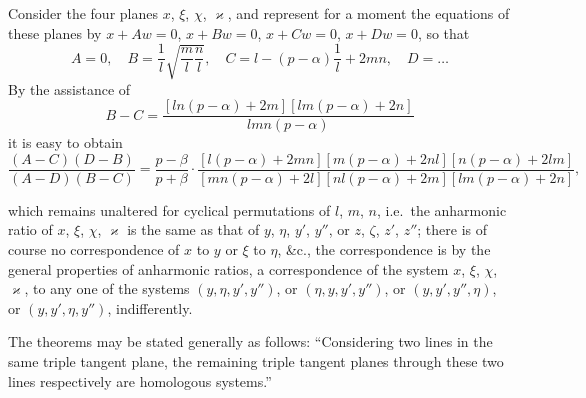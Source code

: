 \documentclass[11pt,a4paper]{book}
\begin{document}
Consider the four planes $x$, $\xi$, $\chi$, $\varkappa$, and represent for a moment the equations of these planes by $x + Aw = 0$, $x + Bw = 0$, $x + Cw = 0$, $x + Dw = 0$, so that
\[
A = 0, \quad B = \frac{1}{l}\sqrt{\frac{m}{l}\frac{n}{l}}, \quad C = l - (p - \alpha)\frac{1}{l} + 2mn, \quad D = \ldots
\]
By the assistance of
\[
B - C = \frac{[ln(p - \alpha) + 2m][lm(p - \alpha) + 2n]}{lmn(p - \alpha)}
\]
it is easy to obtain
\[
\frac{(A - C)(D - B)}{(A - D)(B - C)} = \frac{p - \beta}{p + \beta} \cdot \frac{[l(p - \alpha) + 2mn][m(p - \alpha) + 2nl][n(p - \alpha) + 2lm]}{[mn(p - \alpha) + 2l][nl(p - \alpha) + 2m][lm(p - \alpha) + 2n]},
\]

\newpage

\setcounter{page}{454}

which remains unaltered for cyclical permutations of $l$, $m$, $n$, i.e.\ the anharmonic ratio of $x$, $\xi$, $\chi$, $\varkappa$ is the same as that of $y$, $\eta$, $y'$, $y''$, or $z$, $\zeta$, $z'$, $z''$; there is of course no correspondence of $x$ to $y$ or $\xi$ to $\eta$, \&c., the correspondence is by the general properties of anharmonic ratios, a correspondence of the system $x$, $\xi$, $\chi$, $\varkappa$, to any one of the systems $(y, \eta, y', y'')$, or $(\eta, y, y', y'')$, or $(y, y', y'', \eta)$, or $(y, y', \eta, y'')$, indifferently.

The theorems may be stated generally as follows: ``Considering two lines in the same triple tangent plane, the remaining triple tangent planes through these two lines respectively are homologous systems.''
\end{document}
